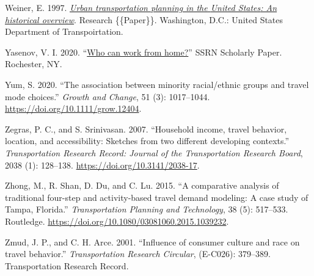 \documentclass[fancy, oneside, mastersfancy, ms]{byuthesis}
\newlength{\cslhangindent}
\newenvironment{CSLReferences}[2] %
 {\begin{list}{}{%
  \setlength{\itemindent}{0pt}
  \setlength{\leftmargin}{0pt}
  \setlength{\parsep}{0pt}
  \ifodd #1
   \setlength{\leftmargin}{\cslhangindent}
   \setlength{\itemindent}{-1\cslhangindent}
  \fi
  \setlength{\itemsep}{#2\baselineskip}}}
 {\end{list}}
\begin{document}
\begin{CSLReferences}{1}{0}
Weiner, E. 1997. \emph{\href{https://doi.org/10.21949/1526591}{Urban
transportation planning in the {United States}: An historical
overview}}. Research \{\{Paper\}\}. Washington, D.C.: United States
Department of Transpoirtation.

Yasenov, V. I. 2020. {``\href{https://doi.org/10.2139/ssrn.3590895}{Who
can work from home?}''} {SSRN Scholarly Paper}. Rochester, NY.

Yum, S. 2020. {``The association between minority racial/ethnic groups
and travel mode choices.''} \emph{Growth and Change}, 51 (3):
1017--1044. \url{https://doi.org/10.1111/grow.12404}.

Zegras, P. C., and S. Srinivasan. 2007. {``Household income, travel
behavior, location, and accessibility: Sketches from two different
developing contexts.''} \emph{Transportation Research Record: Journal of
the Transportation Research Board}, 2038 (1): 128--138.
\url{https://doi.org/10.3141/2038-17}.

Zhong, M., R. Shan, D. Du, and C. Lu. 2015. {``A comparative analysis of
traditional four-step and activity-based travel demand modeling: A case
study of {Tampa}, {Florida}.''} \emph{Transportation Planning and
Technology}, 38 (5): 517--533. Routledge.
\url{https://doi.org/10.1080/03081060.2015.1039232}.

Zmud, J. P., and C. H. Arce. 2001. {``Influence of consumer culture and
race on travel behavior.''} \emph{Transportation Research Circular},
(E-C026): 379--389. Transportation Research Record.

\end{CSLReferences}
\end{document}
